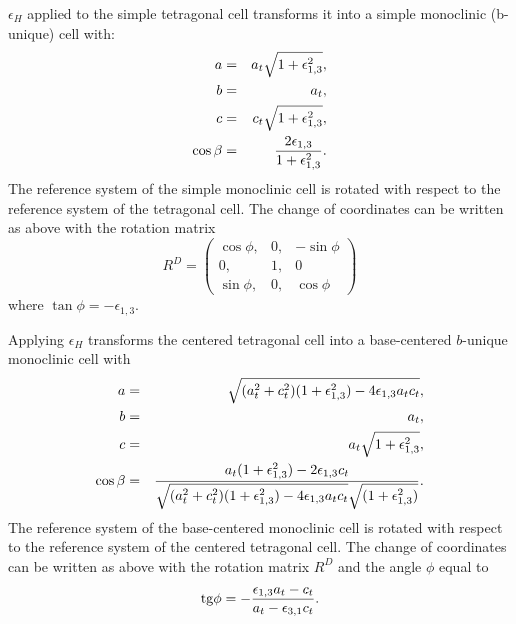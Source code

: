 \documentclass[12pt,a4paper]{article}
\begin{document}
$\epsilon_H$ applied to the simple tetragonal cell transforms it into a 
simple monoclinic (b-unique) cell with:
\begin{eqnarray}
a&=&a_t \sqrt{1+\epsilon_{1,3}^2}, \\
b&=&a_t, \\
c&=&c_t \sqrt{1+\epsilon_{1,3}^2}, \\
\cos\beta &=& {2 \epsilon_{1,3} \over 1 + \epsilon_{1,3}^2}.
\end{eqnarray}
The reference system of the simple monoclinic cell is rotated with respect to
the reference system of the tetragonal cell. 
The change of coordinates can be written as above with the rotation matrix 
\begin{equation}
R^D=\left( \begin{array}{ccc}
\cos\phi, & 0, & -\sin\phi \\
0, & 1, & 0 \\
\sin\phi, & 0, & \cos\phi  
\end{array}
\right)
\end{equation}
where $\tan \phi=-\epsilon_{1,3}$.

Applying $\epsilon_H$ transforms the centered tetragonal cell into 
a base-centered $b$-unique monoclinic cell with
\begin{eqnarray}
a&=&\sqrt{(a_t^2+c_t^2)(1+\epsilon_{1,3}^2)-4\epsilon_{1,3}a_tc_t}, \\
b&=&a_t, \\
c&=&a_t \sqrt{1+\epsilon_{1,3}^2}, \\
\cos\beta &=& {a_t (1+\epsilon_{1,3}^2) -2 \epsilon_{1,3} c_t \over 
\sqrt{(a_t^2+c_t^2)(1+\epsilon_{1,3}^2)-4\epsilon_{1,3}a_tc_t} 
\sqrt{(1+\epsilon_{1,3}^2)}}.
\end{eqnarray}
The reference system of the base-centered monoclinic cell is rotated with 
respect to the reference system of the centered tetragonal cell. 
The change of coordinates can be written as above with the rotation matrix 
$R^D$ and the angle $\phi$ equal to
\begin{equation}
{\rm tg} \phi = -{\epsilon_{1,3} a_t - c_t \over a_t - \epsilon_{3,1} c_t}.
\end{equation}
\end{document}
